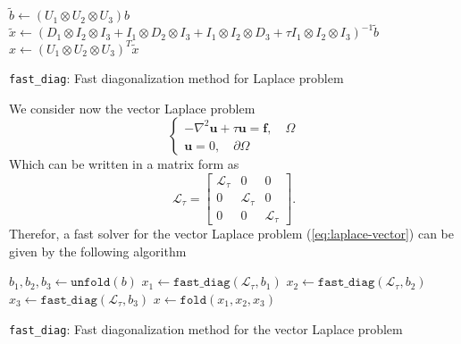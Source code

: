 \begin{algorithm}[ht]
\DontPrintSemicolon
\SetAlgoLined
{}
\BlankLine
$\tilde{b} \gets \left( U_1 \otimes U_2 \otimes U_3 \right) b$ \; 
$\tilde{x} \gets \left( D_1 \otimes I_2 \otimes I_3 +  I_1 \otimes D_2 \otimes I_3 + I_1 \otimes I_2 \otimes D_3 + \tau I_1 \otimes I_2 \otimes I_3 \right)^{-1} \tilde{b}$ \; 
$x \gets \left( U_1 \otimes U_2 \otimes U_3 \right)^T \tilde{x}$ \; 

\caption{\texttt{fast\_diag}: Fast diagonalization method for Laplace problem}
\end{algorithm} 
We consider now the vector Laplace problem
\begin{equation}
  \begin{cases}
  - \nabla^2 \mathbf{u} + \tau \mathbf{u} = \mathbf{f}, \quad \Omega \\
  \mathbf{u}=0, \quad \partial\Omega
  \end{cases}
  \label{eq:laplace-vector}
\end{equation}
Which can be written in a matrix form as
\begin{equation} 
  \bm{\mathcal{L}}_{\tau} =
  \begin{bmatrix}
   \mathcal{L}_{\tau} &                  0 & 0  \\
                    0 & \mathcal{L}_{\tau} & 0  \\
                    0 &                  0 & \mathcal{L}_{\tau}  
  \end{bmatrix}.
  \label{eq:laplace-vector-matrix-form}
\end{equation}
Therefor, a fast solver for the vector Laplace problem (\ref{eq:laplace-vector}) can be given by the following algorithm
\begin{algorithm}[H]
\DontPrintSemicolon
\SetAlgoLined
{}
\BlankLine

  $b_1, b_2, b_3 \gets \texttt{unfold}(b)$ \; 
  $x_1 \gets \texttt{fast\_diag}(\mathcal{L}_{\tau}, b_1)$ \; 
  $x_2 \gets \texttt{fast\_diag}(\mathcal{L}_{\tau}, b_2)$ \; 
  $x_3 \gets \texttt{fast\_diag}(\mathcal{L}_{\tau}, b_3)$ \; 
  $x \gets \texttt{fold}(x_1, x_2, x_3)$ \; 

\caption{\texttt{fast\_diag}: Fast diagonalization method for the vector Laplace problem}
\end{algorithm} 


